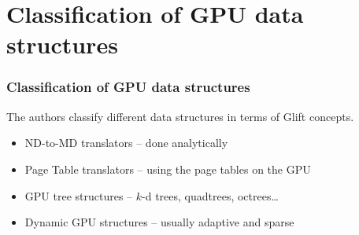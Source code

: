 \documentclass[xcolor={usenames,dvipsnames}]{beamer}
\begin{document}
\section{Classification of GPU data structures}
\begin{frame}
  \frametitle{Classification of GPU data structures}

  The authors classify different data structures in terms of Glift concepts.
  \begin{itemize}
  \item<2-> ND-to-MD translators -- done analytically
  \item<3-> Page Table translators -- using the page tables on the GPU
  \item<4-> GPU tree structures -- $k$-d trees, quadtrees, octrees\ldots
  \item<5-> Dynamic GPU structures -- usually adaptive and sparse
  \end{itemize}
\end{frame}
\end{document}
